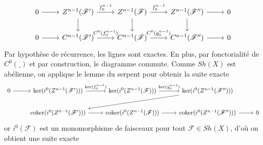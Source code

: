 \documentclass[a4paper,12pt]{article}
\newcommand{\F}{\mathscr F}
\newcommand{\coker}{\textrm{coker}}
\theoremstyle{plain}
\theoremstyle{definition}
\theoremstyle{remark}
\begin{document}
\[\begin{tikzcd}
	0 & {Z^{n-1}(\F')} & {Z^{n-1}(\F)} & {Z^{n-1}(\F'')} & 0 \\
	0 & {C^{n-1}(\F')} & {C^{n-1}(\F)} & {C^{n-1}(\F'')} & 0
	\arrow[from=1-1, to=1-2]
	\arrow["{f_0^{n-1}}", from=1-2, to=1-3]
	\arrow[from=1-2, to=2-2]
	\arrow["{f_0^{n-1}}", from=1-3, to=1-4]
	\arrow[from=1-3, to=2-3]
	\arrow[from=1-4, to=1-5]
	\arrow[from=1-4, to=2-4]
	\arrow[from=2-1, to=2-2]
	\arrow["{C^0(f_0^{n-1})}", from=2-2, to=2-3]
	\arrow["{C^0(g_0^{n-1})}", from=2-3, to=2-4]
	\arrow[from=2-4, to=2-5]
\end{tikzcd}\]
Par hypothèse de récurrence, les lignes sont exactes. En plus, par 
fonctorialité de $C^0(\_)$ et par construction, le diagramme commute.
Comme $Sh(X)$ est abélienne, on applique le lemme du serpent pour obtenir
la suite exacte
\[\begin{tikzcd}
	0 & {\ker(i^0(Z^{n-1}(\F')))} & {\ker(i^0(Z^{n-1}(\F)))} & {\ker(i^0(Z^{n-1}(\F'')))} \\
	& {\coker(i^0(Z^{n-1}(\F')))} & {\coker(i^0(Z^{n-1}(\F)))} & {\coker(i^0(Z^{n-1}(\F'')))} & 0
	\arrow[from=1-1, to=1-2]
	\arrow["{\ker(f_0^{n-1})}", from=1-2, to=1-3]
	\arrow["{\ker(g_0^{n-1})}", from=1-3, to=1-4]
	\arrow[from=1-4, to=2-2]
	\arrow[from=2-2, to=2-3]
	\arrow[from=2-3, to=2-4]
	\arrow[from=2-4, to=2-5]
\end{tikzcd}\]
or $i^0(\F)$ est un monomorphisme de faisceaux pour tout $\F\in Sh(X)$,
d'où on obtient une suite exacte
\end{document}
